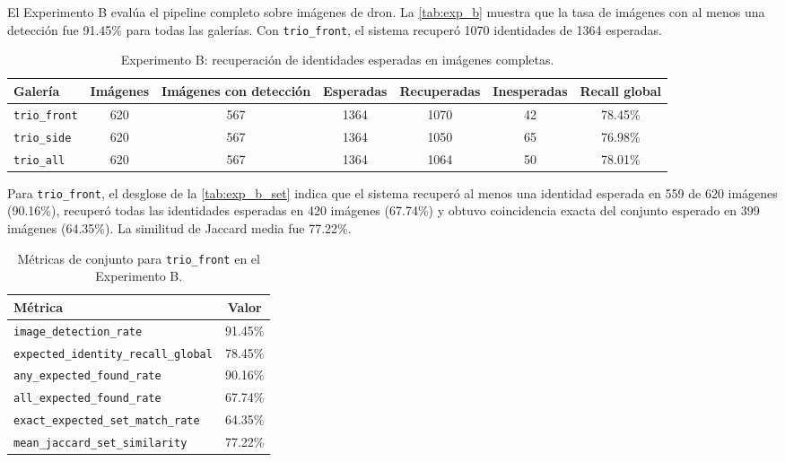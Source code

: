 \documentclass[11pt]{article}
\begin{document}
El Experimento B eval\'ua el pipeline completo sobre im\'agenes de dron. La \autoref{tab:exp_b} muestra que la tasa de im\'agenes con al menos una detecci\'on fue 91.45\% para todas las galer\'ias. Con \texttt{trio\_front}, el sistema recuper\'o 1070 identidades de 1364 esperadas.

\begin{table}[H]
\centering
\caption{Experimento B: recuperaci\'on de identidades esperadas en im\'agenes completas.}
\label{tab:exp_b}
\begin{adjustbox}{max width=\textwidth}
\begin{tabular}{lcccccc}
\toprule
Galer\'ia & Im\'agenes & Im\'agenes con detecci\'on & Esperadas & Recuperadas & Inesperadas & Recall global \\
\midrule
\texttt{trio\_front} & 620 & 567 & 1364 & 1070 & 42 & 78.45\% \\
\texttt{trio\_side} & 620 & 567 & 1364 & 1050 & 65 & 76.98\% \\
\texttt{trio\_all} & 620 & 567 & 1364 & 1064 & 50 & 78.01\% \\
\bottomrule
\end{tabular}
\end{adjustbox}
\end{table}

Para \texttt{trio\_front}, el desglose de la \autoref{tab:exp_b_set} indica que el sistema recuper\'o al menos una identidad esperada en 559 de 620 im\'agenes (90.16\%), recuper\'o todas las identidades esperadas en 420 im\'agenes (67.74\%) y obtuvo coincidencia exacta del conjunto esperado en 399 im\'agenes (64.35\%). La similitud de Jaccard media fue 77.22\%.

\begin{table}[H]
\centering
\caption{M\'etricas de conjunto para \texttt{trio\_front} en el Experimento B.}
\label{tab:exp_b_set}
\begin{tabular}{lc}
\toprule
M\'etrica & Valor \\
\midrule
\texttt{image\_detection\_rate} & 91.45\% \\
\texttt{expected\_identity\_recall\_global} & 78.45\% \\
\texttt{any\_expected\_found\_rate} & 90.16\% \\
\texttt{all\_expected\_found\_rate} & 67.74\% \\
\texttt{exact\_expected\_set\_match\_rate} & 64.35\% \\
\texttt{mean\_jaccard\_set\_similarity} & 77.22\% \\
\bottomrule
\end{tabular}
\end{table}
\end{document}
